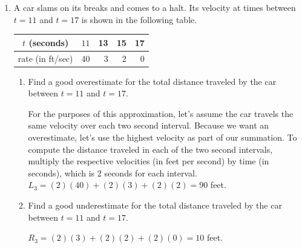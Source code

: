 \documentclass{article}
\begin{document}
\begin{enumerate}
\begin{enumerate}
\vfill \vfill 
    \end{enumerate}
 
\newpage
 \item A car slams on its breaks and comes to a halt.  Its velocity at times between
    $t=11$ and $t=17$ is shown in the following table.
\begin{center}
    \begin{tabular}{  | c | r  r  r  r  | } 
    \hline
      $t$ (seconds)& $11$& 13& 15& 17\\
      \hline
      rate (in ft/sec)& 40& 3& 2& 0 \\ \hline
    \end{tabular}
\end{center}
  \begin{enumerate}
    \item
      \begin{problem}
        Find a good overestimate for the total distance traveled by the car
        between $t = 11$ and $t = 17$.
      \end{problem}
      
      \begin{solution}
        For the purposes of this approximation, let's assume the car travels the same velocity over each two second interval. Because we want an overestimate, let's use the highest velocity as part of our summation. To compute the distance traveled in each of the two second intervals, multiply the respective velocities (in feet per second) by time (in seconds), which is 2 seconds for each interval.
        \newline
        \newline
        $L_3 = (2)(40)+(2)(3)+(2)(2)=90$ feet.
      \end{solution}
      \vfill 

      

    \item
      \begin{problem}
        Find a good underestimate for the total distance traveled by the car
        between $t = 11$ and $t = 17$.  
      \end{problem}

      \begin{solution}
        $R_3 = (2)(3)+(2)(2)+(2)(0)=10$ feet.
      \end{solution}
\vfill 
\end{enumerate}



\end{enumerate}
\end{document}
